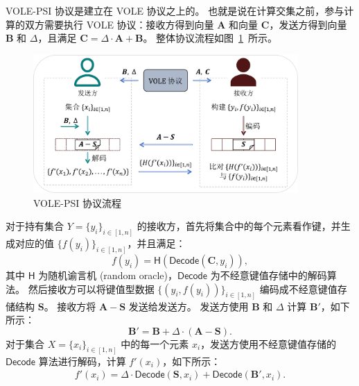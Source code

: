VOLE-PSI 协议是建立在 VOLE 协议之上的。
也就是说在计算交集之前，参与计算的双方需要执行 VOLE 协议：接收方得到向量 $\mathbf{A}$ 和向量 $\mathbf{C}$，发送方得到向量 $\mathbf{B}$ 和 $\Delta$，且满足 $\mathbf{C} = \Delta \cdot \mathbf{A} + \mathbf{B}$。
整体协议流程如图~\ref{fig:psi_okvs}~所示。
\begin{figure}[ht]
  \centering
  \includegraphics[width=0.9\textwidth]{figures/psi_okvs.pdf}
  \caption{VOLE-PSI 协议流程}
  \label{fig:psi_okvs}
\end{figure}
对于持有集合 $Y=\{y_i\}_{i\in [1,n]}$ 的接收方，首先将集合中的每个元素看作键，并生成对应的值 $\{f(y_i)\}_{i\in [1,n]}$，并且满足：
\begin{equation}
  f(y_i) = \mathsf{H}(\mathsf{Decode}(\mathbf{C}, y_i)),
\end{equation}
其中 $\mathsf{H}$ 为随机谕言机 (random oracle)，$\mathsf{Decode}$ 为不经意键值存储中的解码算法。
然后接收方可以将键值型数据 $\{(y_i, f(y_i))\}_{i\in [1,n]}$ 编码成不经意键值存储结构 $\mathbf{S}$。
接收方将 $\mathbf{A} - \mathbf{S}$ 发送给发送方。
发送方使用 $\mathbf{B}$ 和 $\Delta$ 计算 $\mathbf{B}'$，如下所示：
\begin{equation}
  \mathbf{B}' = \mathbf{B} + \Delta\cdot (\mathbf{A} - \mathbf{S}).
\end{equation}
对于集合 $X=\{x_i\}_{i\in [1,n]}$ 中的每一个元素 $x_i$，发送方使用不经意键值存储的 $\mathsf{Decode}$ 算法进行解码，计算 $f'(x_i)$，如下所示：
\begin{align}
  f'(x_i) = \Delta \cdot \mathsf{Decode}(\mathbf{S}, x_i) + \mathsf{Decode}(\mathbf{B'}, x_i).
\end{align}
